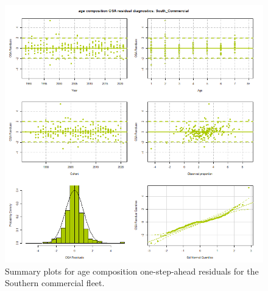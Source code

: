 \documentclass[
]{article}
\begin{document}
\begin{figure}

{\centering \includegraphics[width=1\linewidth]{../2023.RT.Runs/Run34/plots_png/diagnostics/OSA_resid_paa_6panel_South_Commercial} 

}

\caption{Summary plots for age composition one-step-ahead residuals for the Southern commercial fleet.}\label{fig:osa-South-comm-paa-summ}
\end{figure}
\end{document}
